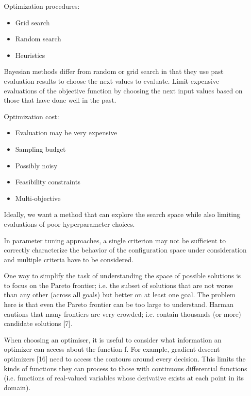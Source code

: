         Optimization procedures:
        \begin{itemize}
            \item Grid search
            \item Random search
            \item Heuristics
        \end{itemize}
        Bayesian methods differ from random or grid search in that they use past evaluation results to choose the next values to evaluate.
        Limit expensive evaluations of the objective function by choosing the next input values based on those that have done well in the past.

        Optimization cost:
        \begin{itemize}
            \item Evaluation may be very expensive
            \item Sampling budget
            \item Possibly noisy
            \item Feasibility constraints
            \item Multi-objective
        \end{itemize}
        Ideally, we want a method that can explore the search space while also limiting evaluations of poor hyperparameter choices.

        In parameter tuning approaches, a single criterion may not be sufficient to correctly characterize the behavior of the 
        configuration space under consideration and multiple criteria have to be considered.

        One way to simplify the task of understanding the space of possible solutions is to focus on the Pareto frontier; i.e. the subset 
        of solutions that are not worse than any other (across all goals) but better on at least one goal. 
        The problem here is that even the Pareto frontier can be too large to understand. Harman cautions that many frontiers are very crowded; i.e. 
        contain thousands (or more) candidate solutions [7].

        When choosing an optimiser, it is useful to consider what information an optimizer can access about the function f. For example, gradient descent optimizers [16] 
        need to access the contours around every decision. This limits the kinds of functions they can process to those with continuous differential functions (i.e. 
        functions of real-valued variables whose derivative exists at each point in its domain).

